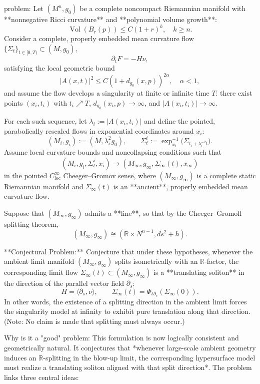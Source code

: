 problem:  
Let \((M^n,g_0)\) be a complete noncompact Riemannian manifold with **nonnegative Ricci curvature** and **polynomial volume growth**:
\[
\operatorname{Vol}(B_r(p)) \le C(1+r)^k, \quad k \ge n.
\]
Consider a complete, properly embedded mean curvature flow \(\{\Sigma_t\}_{t\in[0,T)} \subset (M,g_0)\),
\[
\partial_t F = -H\nu,
\]
satisfying the local geometric bound
\[
|A(x,t)|^2 \le C(1+d_{g_0}(x,p))^{2\alpha}, \quad \alpha<1,
\]
and assume the flow develops a singularity at finite or infinite time \(T\): there exist points \((x_i,t_i)\) with \(t_i\nearrow T\), \(d_{g_0}(x_i,p)\to\infty\), and \(|A(x_i,t_i)|\to\infty\).

For each such sequence, let \(\lambda_i := |A(x_i,t_i)|\) and define the pointed, parabolically rescaled flows in exponential coordinates around \(x_i\):
\[
(M_i,g_i) := (M,\lambda_i^2 g_0),
\qquad
\Sigma^i_t := \exp_{x_i}^{-1}\big(\Sigma_{t_i+\lambda_i^{-2}t}\big).
\]
Assume local curvature bounds and noncollapsing conditions such that
\[
(M_i,g_i,\Sigma^i_t,x_i) \to (M_\infty,g_\infty,\Sigma_\infty(t),x_\infty)
\]
in the pointed \(C^\infty_{\mathrm{loc}}\) Cheeger–Gromov sense, where \((M_\infty,g_\infty)\) is a complete static Riemannian manifold and \(\Sigma_\infty(t)\) is an **ancient**, properly embedded mean curvature flow.

Suppose that \((M_\infty,g_\infty)\) admits a **line**, so that by the Cheeger–Gromoll splitting theorem,
\[
(M_\infty,g_\infty) \cong (\mathbb{R}\times N^{n-1}, ds^2 + h).
\]

**Conjectural Problem:**  
Conjecture that under these hypotheses, whenever the ambient limit manifold \((M_\infty,g_\infty)\) splits isometrically with an \(\mathbb{R}\)-factor, the corresponding limit flow \(\Sigma_\infty(t)\subset (M_\infty,g_\infty)\) is a **translating soliton** in the direction of the parallel vector field \(\partial_s\):
\[
H = \langle \partial_s, \nu \rangle,
\qquad
\Sigma_\infty(t) = \Phi_{t\partial_s}(\Sigma_\infty(0)).
\]
In other words, the existence of a splitting direction in the ambient limit forces the singularity model at infinity to exhibit pure translation along that direction.  
(Note: No claim is made that splitting must always occur.)

Why is it a "good" problem:  
This formulation is now logically consistent and geometrically natural. It conjectures that *whenever large-scale ambient geometry induces an \(\mathbb{R}\)-splitting in the blow-up limit, the corresponding hypersurface model must realize a translating soliton aligned with that split direction*. The problem links three central ideas:

